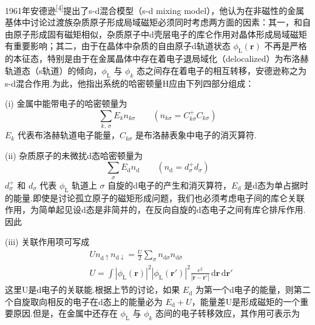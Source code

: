 1961年安德逊\textsuperscript{[4]}提出了s-d混合模型（s-d mixing model），他认为在非磁性的金属基体中讨论过渡族杂质原子形成局域磁矩必须同时考虑两方面的因素：其一，和自由原子形成固有磁矩相似，杂质原子中d壳层电子的库仑作用对晶体形成局域磁矩有重要影响；其二，由于在晶体中杂质的自由原子d轨道状态 $\phi_{\mathrm{L}}(\boldsymbol{r})$ 不再是严格的本征态，特别是由于在金属晶体中存在着电子退局域化（delocalized）为布洛赫轨道态（s轨道）的倾向，$\phi_{\mathrm{L}}$ 与 $\phi_{k}$ 态之间存在着电子的相互转移，安德逊称之为s-d混合作用.为此，他指出系统的哈密顿量H应由下列四部分组成：

(i) 金属中能带电子的哈密顿量为
\begin{equation}
  \sum_{k,\,\sigma}E_{k}n_{k\sigma}
  \qquad(n_{k\sigma}=C^{+}_{k\sigma}C_{k\sigma})
\end{equation}
$E_{k}$ 代表布洛赫轨道电子能量，$C_{k\sigma}$ 是布洛赫表象中电子的消灭算符.

(ii) 杂质原子的未微扰d态哈密顿量为
\begin{equation}
  \sum_{\sigma}E_{\mathrm{d}}n_{\mathrm{d}}
  \qquad(n_{\mathrm{d}}=d^{+}_{\sigma}d_{\sigma})
\end{equation}
$d^{+}_{\sigma}$ 和 $d_{\sigma}$ 代表 $\phi_{\mathrm{L}}$ 轨道上 $\sigma$ 自旋的d电子的产生和消灭算符，$E_{\mathrm{d}}$ 是d态为单占据时的能量.即使是讨论孤立原子的磁矩形成问题，我们也必须考虑电子间的库仑关联作用，为简单起见设d态是非简并的，在反向自旋的d态电子之间有库仑排斥作用.因此

(iii) 关联作用项可写成
\begin{equation}
\begin{aligned}
  &Un_{\mathrm{d}\uparrow}n_{\mathrm{d}\downarrow}
  =\frac{U}{2}\sum_{\sigma}n_{\mathrm{d}\sigma}n_{\mathrm{d}\bar{\sigma}}\\
  &U=\int|\phi_{\mathrm{L}}(\boldsymbol{r})|^{2}
  |\phi_{\mathrm{L}}(\boldsymbol{r}')|^{2}
  \frac{e^{2}}{|\boldsymbol{r}-\boldsymbol{r}'|}
  \,\mathrm{d}\boldsymbol{r}\,\mathrm{d}\boldsymbol{r}'
\end{aligned}
\end{equation}
这里U是d电子的关联能.根据上节的讨论，如果 $E_{\mathrm{d}}$ 为第一个d电子的能量，则第二个自旋取向相反的电子在d态上的能量必为 $E_{\mathrm{d}}+U$，能量差U是形成磁矩的一个重要原因.但是，在金属中还存在 $\phi_{\mathrm{L}}$ 与 $\phi_{k}$ 态间的电子转移效应，其作用可表示为

